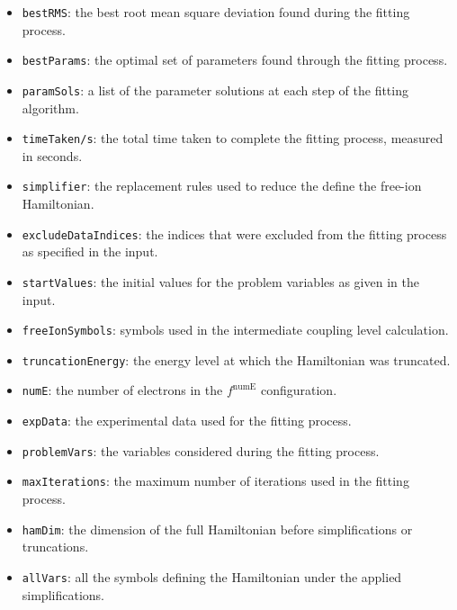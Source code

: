 \documentclass{article}
\newcommand{\codetext}[1]{{\color{BlueViolet} \texttt{#1}}}
\begin{document}
\begin{itemize}
    \item \codetext{bestRMS}: the best root mean square deviation found during the fitting process.

    \item \codetext{bestParams}: the optimal set of parameters found through the fitting process.

    \item \codetext{paramSols}: a list of the parameter solutions at each step of the fitting algorithm.

    \item \codetext{timeTaken/s}: the total time taken to complete the fitting process, measured in seconds.

    \item \codetext{simplifier}: the replacement rules used to reduce the define the free-ion Hamiltonian.

    \item \codetext{excludeDataIndices}: the indices that were excluded from the fitting process as specified in the input.

    \item \codetext{startValues}: the initial values for the problem variables as given in the input.

    \item \codetext{freeIonSymbols}: symbols used in the intermediate coupling level calculation.

    \item \codetext{truncationEnergy}: the energy level at which the Hamiltonian was truncated.

    \item \codetext{numE}: the number of electrons in the $f^{\text{numE}}$ configuration.

    \item \codetext{expData}: the experimental data used for the fitting process. 

    \item \codetext{problemVars}: the variables considered during the fitting process.

    \item \codetext{maxIterations}: the maximum number of iterations used in the fitting process.

    \item \codetext{hamDim}: the dimension of the full Hamiltonian before simplifications or truncations.

    \item \codetext{allVars}: all the symbols defining the Hamiltonian under the applied simplifications.


\end{itemize}
\end{document}
